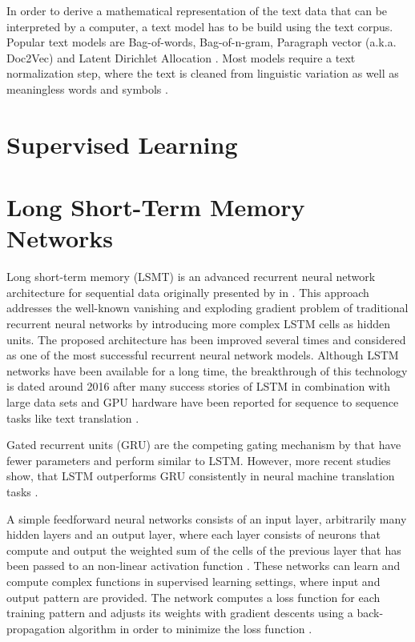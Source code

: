 In order to derive a mathematical representation of the text data that can be interpreted by a computer, a text model has to be build using the text corpus.
Popular text models are Bag-of-words, Bag-of-n-gram, Paragraph vector (a.k.a. Doc2Vec) \cite{DBLP:conf/icml/LeM14} and Latent Dirichlet Allocation \cite{DBLP:journals/jmlr/BleiNJ03}.
Most models require a text normalization step, where the text is cleaned from linguistic variation as well as meaningless words and symbols \cite{DBLP:books/lib/JurafskyM09}.

\section{Supervised Learning}



\section{Long Short-Term Memory Networks}

Long short-term memory (LSMT) is an advanced recurrent neural network architecture for sequential data originally presented by \citeauthor{DBLP:journals/neco/HochreiterS97} in \citeyear{DBLP:journals/neco/HochreiterS97}  \cite{DBLP:journals/neco/HochreiterS97}.
This approach addresses the well-known vanishing and exploding gradient problem \cite{DBLP:conf/icml/PascanuMB13}  of traditional recurrent neural networks by introducing more complex LSTM cells as hidden units.
The proposed architecture has been improved several times \cite{DBLP:journals/neco/GersSC00} \cite {DBLP:journals/tnn/GreffSKSS17} and considered as one of the most successful recurrent neural network models.
Although LSTM networks have been available for a long time, the breakthrough of this technology is dated around 2016 after many success stories of LSTM in combination with large data sets and GPU hardware have been reported for sequence to sequence tasks like text translation \cite{DBLP:journals/corr/WuSCLNMKCGMKSJL16}.

Gated recurrent units (GRU) \cite{DBLP:conf/emnlp/ChoMGBBSB14} are the competing gating mechanism by \citeauthor{DBLP:conf/emnlp/ChoMGBBSB14} that have fewer parameters and perform similar to LSTM.
However, more recent studies show, that LSTM outperforms GRU consistently in neural machine translation tasks \cite{DBLP:journals/corr/BritzGLL17}.

A simple feedforward neural networks consists of an input layer, arbitrarily many hidden layers and an output layer, where each layer consists of neurons that compute and output the weighted sum of the cells of the previous layer that has been passed to an non-linear activation function \cite{DBLP:journals/nn/Schmidhuber15}.
These networks can learn and compute complex functions in supervised learning settings, where input and output pattern are provided.
The network computes a loss function for each training pattern and adjusts its weights with gradient descents using a back-propagation algorithm in order to minimize the loss function \cite{rumelhart1986learning}.

